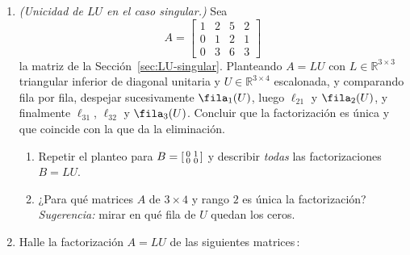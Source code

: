 \begin{enumerate}

\item\label{ej:LU-singular} \emph{(Unicidad de $LU$ en el caso singular.)}
Sea
\[
A = \begin{bmatrix}
1 & 2 & 5 & 2 \\
0 & 1 & 2 & 1 \\
0 & 3 & 6 & 3
\end{bmatrix}
\]
la matriz de la Sección~\ref{sec:LU-singular}. Planteando $A=LU$ con
$L\in\mathbb{R}^{3\times3}$ triangular inferior de diagonal unitaria y
$U\in\mathbb{R}^{3\times4}$ escalonada, y comparando fila por fila, despejar
sucesivamente $\fila_1(U)$, luego $\ell_{21}$ y $\fila_2(U)$, y finalmente
$\ell_{31}$, $\ell_{32}$ y $\fila_3(U)$. Concluir que la factorización es
única y que coincide con la que da la eliminación.
\begin{enumerate}[label=\textup{(\alph*)}]
\item Repetir el planteo para
$B=\begin{bsmallmatrix} 0&1\\ 0&0\end{bsmallmatrix}$ y describir
\emph{todas} las factorizaciones $B=LU$.
\item ¿Para qué matrices $A$ de $3\times4$ y rango $2$ es única la
factorización? \emph{Sugerencia:} mirar en qué fila de $U$ quedan los ceros.
\end{enumerate}

\item Halle la factorización $A=LU$ de las siguientes matrices\,:


\end{enumerate}
